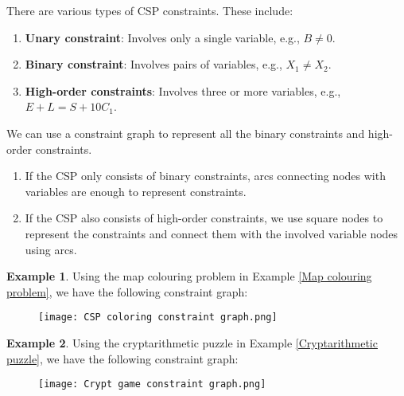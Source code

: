 \documentclass{article}
\theoremstyle{definition}
\newtheorem{example}{Example}[definition]
\begin{document}
\newpage
There are various types of CSP constraints. These include:
\begin{enumerate}
	\item \textbf{Unary constraint}: Involves only a single variable, e.g., $B\neq 0$.
	\item \textbf{Binary constraint}: Involves pairs of variables, e.g., $X_{1}\neq X_{2}$.
	\item \textbf{High-order constraints}: Involves three or more variables, e.g., $E+L=S+10C_{1}$.
\end{enumerate}
We can use a constraint graph to represent all the binary constraints and high-order constraints.
\begin{enumerate}
	\item If the CSP only consists of binary constraints, arcs connecting nodes with variables are enough to represent constraints.
	\item If the CSP also consists of high-order constraints, we use square nodes to represent the constraints and connect them with the involved variable nodes using arcs.
\end{enumerate}
\begin{example}
	Using the map colouring problem in Example \ref{Map colouring problem}, we have the following constraint graph:
	\begin{figure}[h]
		\centering
		\texttt{[image: CSP coloring constraint graph.png]}
	\end{figure}
\end{example}
\begin{example}
	Using the cryptarithmetic puzzle in Example \ref{Cryptarithmetic puzzle}, we have the following constraint graph:
	\begin{figure}[h]
		\centering
		\texttt{[image: Crypt game constraint graph.png]}
	\end{figure}
\end{example}

\newpage
\end{document}
